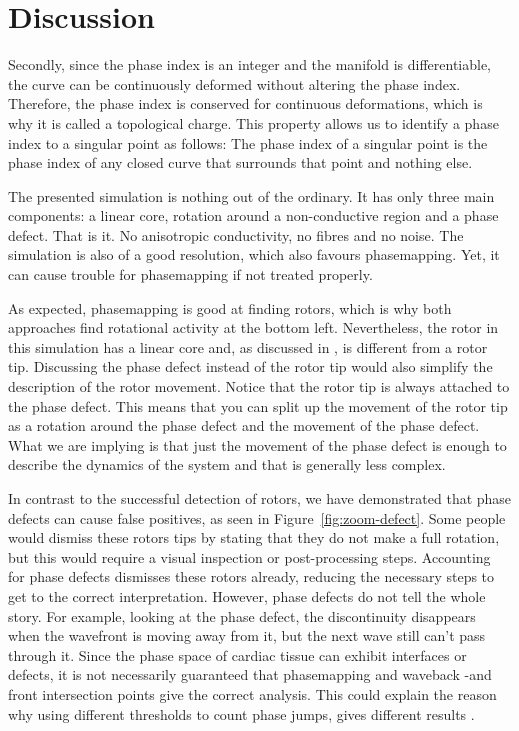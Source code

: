 \documentclass[twocolumn]{article}
\begin{document}
\section{Discussion}\label{discussion}

Secondly, since the phase index is an integer and the manifold is
differentiable, the curve can be continuously deformed without altering
the phase index. Therefore, the phase index is conserved for continuous
deformations, which is why it is called a topological charge. This
property allows us to identify a phase index to a singular point as
follows: The phase index of a singular point is the phase index of any
closed curve that surrounds that point and nothing else.

The presented simulation is nothing out of the ordinary. It has only
three main components: a linear core, rotation around a non-conductive
region and a phase defect. That is it. No anisotropic conductivity, no
fibres and no noise. The simulation is also of a good resolution, which
also favours phasemapping. Yet, it can cause trouble for phasemapping if
not treated properly.

As expected, phasemapping is good at finding rotors, which is why both
approaches find rotational activity at the bottom left. Nevertheless,
the rotor in this simulation has a linear core and, as discussed in
\autocite{arno2021a, tomii2021spatial}, is different from a rotor tip.
Discussing the phase defect instead of the rotor tip would also simplify
the description of the rotor movement. Notice that the rotor tip is
always attached to the phase defect. This means that you can split up
the movement of the rotor tip as a rotation around the phase defect and
the movement of the phase defect. What we are implying is that just the
movement of the phase defect is enough to describe the dynamics of the
system and that is generally less complex.

In contrast to the successful detection of rotors, we have demonstrated
that phase defects can cause false positives, as seen in
Figure~\ref{fig:zoom-defect}. Some people would dismiss these rotors tips
by stating that they do not make a full rotation, but this would require
a visual inspection or post-processing steps. Accounting for phase
defects dismisses these rotors already, reducing the necessary steps to
get to the correct interpretation.
However, phase defects do not tell the whole story. For example, looking
at the phase defect, the discontinuity disappears when the wavefront is
moving away from it, but the next wave still can't pass through it.
Since the phase space of cardiac tissue can exhibit interfaces or
defects, it is not necessarily guaranteed that phasemapping and waveback
-and front intersection points give the correct analysis. This could
explain the reason why using different thresholds to count phase jumps,
gives different results \autocite{li2020standardizing}.
\end{document}

